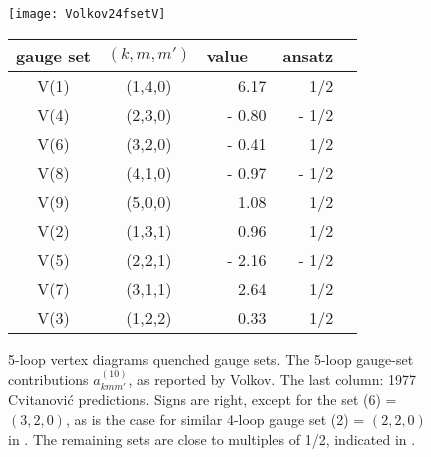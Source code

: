 \begin{figure}[t]
\begin{center}
\texttt{[image: Volkov24fsetV]}
  \\[3ex]
\begin{tabular}{ccrrr}
gauge set &$(k,m,m')$& value~~ & ansatz \\
\hline
  V(1)  & (1,4,0) &   \phantom{+} 6.17  & \phantom{+} 1/2  \\%
  V(4)  & (2,3,0) &  - 0.80  & - 1/2 \\ %
  V(6)  & (3,2,0) &{\color{red}- 0.41} & \phantom{+} 1/2  \\%
  V(8)  & (4,1,0) &  - 0.97  & - 1/2  \\%
  V(9)  & (5,0,0) &  \phantom{+} 1.08  & \phantom{+} 1/2  \\%
  V(2)  & (1,3,1) &  \phantom{+} 0.96  & \phantom{+} 1/2  \\%
  V(5)  & (2,2,1) &  - 2.16  &  - 1/2  \\%
  V(7)  & (3,1,1) &  \phantom{+} 2.64  & \phantom{+} 1/2  \\%
  V(3)  & (1,2,2) &  \phantom{+} 0.33 & \phantom{+} 1/2  \\%
\hline
\end{tabular}
 \end{center}
\caption{\label{Volkov24fsetV}
5-loop vertex diagrams quenched gauge sets.
The 5-loop gauge-set contributions $a^{(10)}_{kmm'}$, as reported by 
Volkov. 
The last column: 1977 Cvitanovi\'c 
predictions. Signs are right, except for the set (6) = 
$(3,2,0)$, as is the case for similar 4-loop gauge set (2) = $(2,2,0)$ in 
. The remaining sets are close to 
multiples of 1/2, indicated in . 
}
 \end{figure}
